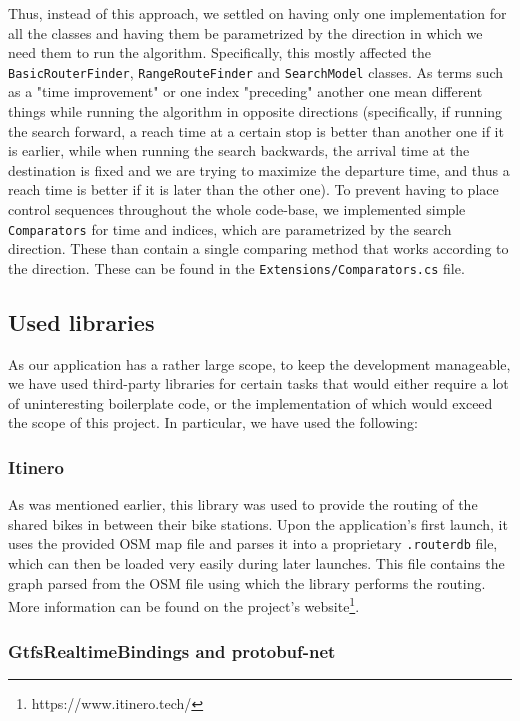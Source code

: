 Thus, instead of this approach, we settled on having only one implementation for all the classes and having them be parametrized by the direction in which we need them to run the algorithm. Specifically, this mostly affected the \texttt{BasicRouterFinder}, \texttt{RangeRouteFinder} and \texttt{SearchModel} classes. As terms such as a "time improvement" or one index "preceding" another one mean different things while running the algorithm in opposite directions (specifically, if running the search forward, a reach time at a certain stop is better than another one if it is earlier, while when running the search backwards, the arrival time at the destination is fixed and we are trying to maximize the departure time, and thus a reach time is better if it is later than the other one). To prevent having to place control sequences throughout the whole code-base, we implemented simple \texttt{Comparators} for time and indices, which are parametrized by the search direction. These than contain a single comparing method that works according to the direction. These can be found in the \texttt{Extensions/Comparators.cs} file.

\subsection{Used libraries}

As our application has a rather large scope, to keep the development manageable, we have used third-party libraries for certain tasks that would either require a lot of uninteresting boilerplate code, or the implementation of which would exceed the scope of this project. In particular, we have used the following:

\subsubsection{Itinero}

As was mentioned earlier, this library was used to provide the routing of the shared bikes in between their bike stations. Upon the application's first launch, it uses the provided OSM map file and parses it into a proprietary \texttt{.routerdb} file, which can then be loaded very easily during later launches. This file contains the graph parsed from the OSM file using which the library performs the routing. More information can be found on the project's website\footnote{https://www.itinero.tech/}.

\subsubsection{GtfsRealtimeBindings and protobuf-net}

